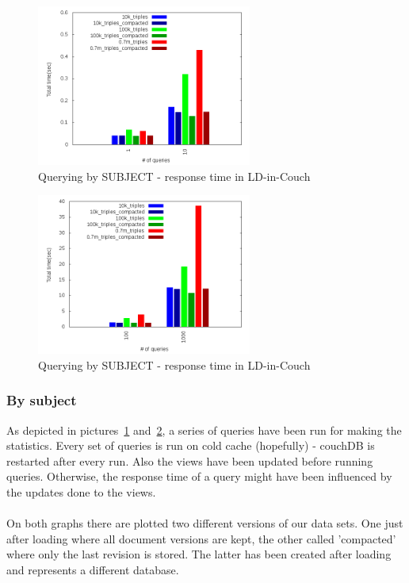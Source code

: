 \documentclass[a4paper,10pt]{article}
\begin{document}
\begin{figure}[h!]
  \centering
  \includegraphics[height=200px]{../couchdb/plots/plot_q_time_1_10.png}
  \caption{Querying by SUBJECT - response time in LD-in-Couch}
  \label{pic:q_subj_1}
\end{figure}
\begin{figure}[h!]
  \centering
  \includegraphics[height=200px]{../couchdb/plots/plot_q_time_10_100.png}
  \caption{Querying by SUBJECT - response time in LD-in-Couch}
  \label{pic:q_subj_2}
\end{figure}
\subsubsection{By subject}
As depicted in pictures~\ref{pic:q_subj_1} and~\ref{pic:q_subj_2}, a series of queries have been run for making the statistics. Every set of queries is run on 
cold cache (hopefully) - couchDB is restarted after every run. Also the views have been updated before running queries. Otherwise, the 
response time of a query might have been influenced by the updates done to the views. 

\paragraph{}
On both graphs there are plotted two different versions of our data sets. One just after loading where all document versions are kept, the 
other called 'compacted' where only the last revision is stored. The latter has been created after loading and represents a different database. 
\end{document}
